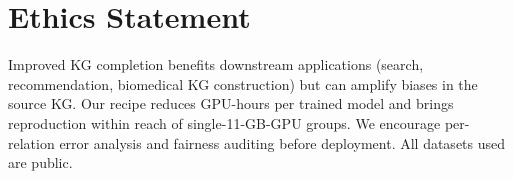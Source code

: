\documentclass[runningheads]{llncs}
\begin{document}
\section*{Ethics Statement}

Improved KG completion benefits downstream applications (search, recommendation, biomedical KG construction) but can amplify biases in the source KG. Our recipe reduces GPU-hours per trained model and brings reproduction within reach of single-11-GB-GPU groups. We encourage per-relation error analysis and fairness auditing before deployment. All datasets used are public.




% 
\end{document}
